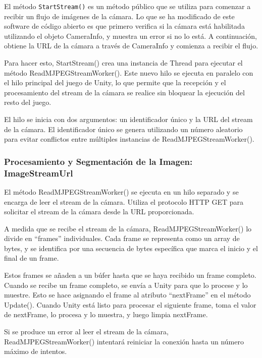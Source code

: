 El método \texttt{StartStream()} es un método público que se utiliza para comenzar a recibir un flujo de imágenes de la cámara. Lo que se ha modificado de este software de código abierto es que primero verifica si la cámara está habilitada utilizando el objeto CameraInfo, y muestra un error si no lo está. A continuación, obtiene la URL de la cámara a través de CameraInfo y comienza a recibir el flujo.



Para hacer esto, StartStream() crea una instancia de Thread para ejecutar el método ReadMJPEGStreamWorker(). Este nuevo hilo se ejecuta en paralelo con el hilo principal del juego de Unity, lo que permite que la recepción y el procesamiento del stream de la cámara se realice sin bloquear la ejecución del resto del juego.



El hilo se inicia con dos argumentos: un identificador único y la URL del stream de la cámara. El identificador único se genera utilizando un número aleatorio para evitar conflictos entre múltiples instancias de ReadMJPEGStreamWorker().

\subsubsection{Procesamiento y Segmentación de la Imagen: ImageStreamUrl}

El método ReadMJPEGStreamWorker() se ejecuta en un hilo separado y se encarga de leer el stream de la cámara. Utiliza el protocolo HTTP GET para solicitar el stream de la cámara desde la URL proporcionada.



A medida que se recibe el stream de la cámara, ReadMJPEGStreamWorker() lo divide en ``frames'' individuales. Cada frame se representa como un array de bytes, y se identifica por una secuencia de bytes específica que marca el inicio y el final de un frame.



Estos frames se añaden a un búfer hasta que se haya recibido un frame completo. Cuando se recibe un frame completo, se envía a Unity para que lo procese y lo muestre. Esto se hace asignando el frame al atributo ``nextFrame'' en el método Update(). Cuando Unity está listo para procesar el siguiente frame, toma el valor de nextFrame, lo procesa y lo muestra, y luego limpia nextFrame.



Si se produce un error al leer el stream de la cámara, ReadMJPEGStreamWorker() intentará reiniciar la conexión hasta un número máximo de intentos.



